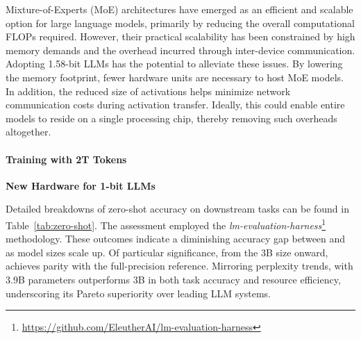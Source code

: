 \begin{abstract}
Building on advancements like BitNet~\cite{bitnet}, the landscape of 1-bit Large Language Models (LLMs) is rapidly evolving. In this study, we present a 1-bit LLM variation called \textbf{}, which represents all model parameters as ternary values chosen from \{-1, 0, 1\}. This architecture achieves parity with full-precision Transformer LLMs (using FP16 or BF16), maintaining similar levels of perplexity and performance across downstream tasks, while dramatically reducing costs in latency, memory usage, computational throughput, and energy demands. Significantly, the 1.58-bit LLM establishes a novel scaling law and training methodology that enables both efficient and high-performing future generations of LLMs. Moreover, this development introduces new computational paradigms and paves the way for specialized hardware tailored for 1-bit LLM workloads.
\end{abstract}

Mixture-of-Experts (MoE) architectures have emerged as an efficient and scalable option for large language models, primarily by reducing the overall computational FLOPs required. However, their practical scalability has been constrained by high memory demands and the overhead incurred through inter-device communication. Adopting 1.58-bit LLMs has the potential to alleviate these issues. By lowering the memory footprint, fewer hardware units are necessary to host MoE models. In addition, the reduced size of activations helps minimize network communication costs during activation transfer. Ideally, this could enable entire models to reside on a single processing chip, thereby removing such overheads altogether.

\paragraph{Training with 2T Tokens}

\textbf{New Hardware for 1-bit LLMs}

Detailed breakdowns of zero-shot accuracy on downstream tasks can be found in Table~\ref{tab:zero-shot}. The assessment employed the \emph{lm-evaluation-harness}\footnote{\url{https://github.com/EleutherAI/lm-evaluation-harness}} methodology. These outcomes indicate a diminishing accuracy gap between  and  as model sizes scale up. Of particular significance, from the 3B size onward,  achieves parity with the full-precision reference. Mirroring perplexity trends,  with 3.9B parameters outperforms  3B in both task accuracy and resource efficiency, underscoring its Pareto superiority over leading LLM systems.

